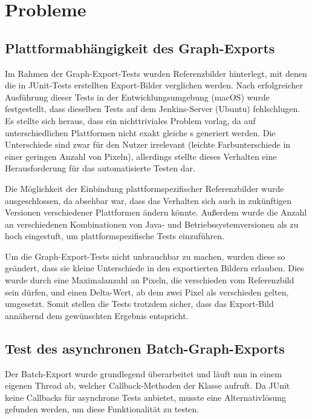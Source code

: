 \newpage
\section{Probleme}

\subsection{Plattformabhängigkeit des Graph-Exports}

Im Rahmen der Graph-Export-Tests wurden Referenzbilder hinterlegt, mit denen die in JUnit-Tests erstellten Export-Bilder verglichen werden.
Nach erfolgreicher Ausführung dieser Tests in der Entwicklungsumgebung (macOS) wurde festgestellt, dass dieselben Tests auf dem Jenkins-Server (Ubuntu) fehlschlugen.
Es stellte sich heraus, dass ein nichttriviales Problem vorlag, da auf unterschiedlichen Plattformen nicht exakt gleiche s generiert werden.
Die Unterschiede sind zwar für den Nutzer irrelevant (leichte Farbunterschiede in einer geringen Anzahl von Pixeln), allerdings stellte dieses Verhalten eine Herausforderung für das automatisierte Testen dar.

Die Möglichkeit der Einbindung plattformspezifischer Referenzbilder wurde ausgeschlossen, da absehbar war, dass das Verhalten sich auch in zukünftigen Versionen verschiedener Plattformen ändern könnte.
Außerdem wurde die Anzahl an verschiedenen Kombinationen von Java- und Betriebssystemversionen als zu hoch eingestuft, um plattformspezifische Tests einzuführen.

Um die Graph-Export-Tests nicht unbrauchbar zu machen, wurden diese so geändert, dass sie kleine Unterschiede in den exportierten Bildern erlauben.
Dies wurde durch eine Maximalanzahl an Pixeln, die verschieden vom Referenzbild sein dürfen, und einen Delta-Wert, ab dem zwei Pixel als verschieden gelten, umgesetzt.
Somit stellen die Tests trotzdem sicher, dass das Export-Bild annähernd dem gewünschten Ergebnis entspricht.

\subsection{Test des asynchronen Batch-Graph-Exports}

Der Batch-Export wurde grundlegend überarbeitet und läuft nun in einem eigenen Thread ab, welcher Callback-Methoden der Klasse  aufruft.
Da JUnit keine Callbacks für asynchrone Tests anbietet, musste eine Alternativlösung gefunden werden, um diese Funktionalität zu testen.

